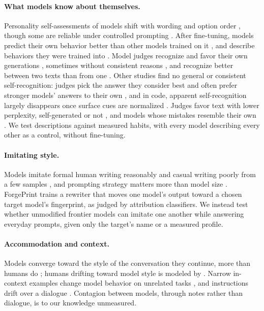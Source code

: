 \documentclass[11pt]{article}
\begin{document}
\paragraph{What models know about themselves.}
Personality self-assessments of models shift with wording and option order \citep{gupta2024selfassessment}, though some are reliable under controlled prompting \citep{serapio2023personality,lee2025trait}.
After fine-tuning, models predict their own behavior better than other models trained on it \citep{binder2024lookinginward}, and describe behaviors they were trained into \citep{betley2025tellme}.
Model judges recognize and favor their own generations \citep{panickssery2024selfrecognition}, sometimes without consistent reasons \citep{ackerman2024recognize}, and recognize better between two texts than from one \citep{zhou2025implicitexplicit}.
Other studies find no general or consistent self-recognition: judges pick the answer they consider best and often prefer stronger models' answers to their own \citep{davidson2024selfrecognition}, and in code, apparent self-recognition largely disappears once surface cues are normalized \citep{barkhordar2026stylenotself}.
Judges favor text with lower perplexity, self-generated or not \citep{wataoka2024selfpreference}, and models whose mistakes resemble their own \citep{goel2025thinkalike}.
We test descriptions against measured habits, with every model describing every other as a control, without fine-tuning.

\paragraph{Imitating style.}
Models imitate formal human writing reasonably and casual writing poorly from a few samples \citep{wang2025catchme}, and prompting strategy matters more than model size \citep{jemama2025imitate}.
ForgePrint \citep{yuan2026forgeprint} trains a rewriter that moves one model's output toward a chosen target model's fingerprint, as judged by attribution classifiers.
We instead test whether unmodified frontier models can imitate one another while answering everyday prompts, given only the target's name or a measured profile.

\paragraph{Accommodation and context.}
Models converge toward the style of the conversation they continue, more than humans do \citep{blevins2026accommodate,blevins2026bothways}; humans drifting toward model style is modeled by \citet{thejaswi2026monoculture}.
Narrow in-context examples change model behavior on unrelated tasks \citep{afonin2025emergent}, and instructions drift over a dialogue \citep{li2024instability}.
Contagion between models, through notes rather than dialogue, is to our knowledge unmeasured.
\end{document}
